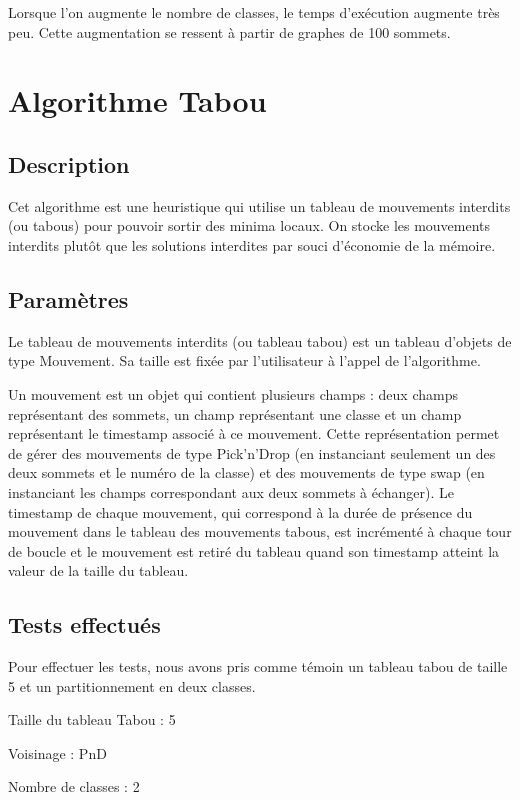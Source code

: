\documentclass[12pt]{article}
\begin{document}
Lorsque l’on augmente le nombre de classes, le temps d'exécution augmente très peu. Cette augmentation se ressent à partir de graphes de 100 sommets.
  

\newpage

\section{Algorithme Tabou}
\subsection{Description}
Cet algorithme est une heuristique qui utilise un tableau de mouvements interdits (ou tabous) pour pouvoir sortir des minima locaux. On stocke les mouvements interdits plutôt que les solutions interdites par souci d’économie de la mémoire.

\subsection{Paramètres}
Le tableau de mouvements interdits (ou tableau tabou) est un tableau d’objets de type Mouvement. Sa taille est fixée par l’utilisateur à l’appel de l’algorithme.

Un mouvement est un objet qui contient plusieurs champs : deux champs représentant des sommets, un champ représentant une classe et un champ représentant le timestamp associé à ce mouvement. Cette représentation permet de gérer des mouvements de type Pick’n’Drop (en instanciant seulement un des deux sommets et le numéro de la classe) et des mouvements de type swap (en instanciant les champs correspondant aux deux sommets à échanger).
Le timestamp de chaque mouvement, qui correspond à la durée de présence du mouvement dans le tableau des mouvements tabous, est incrémenté à chaque tour de boucle et le mouvement est retiré du tableau quand son timestamp atteint la valeur de la taille du tableau.

\subsection{Tests effectués}
Pour effectuer les tests, nous avons pris comme témoin un tableau tabou de taille 5 et un partitionnement en deux classes.

\bigskip

Taille du tableau Tabou : 5

Voisinage : PnD

Nombre de classes : 2
\bigskip
\end{document}
